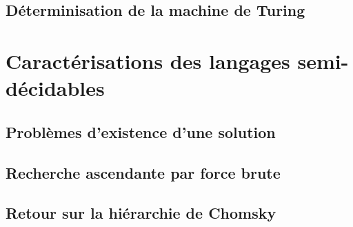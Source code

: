 \documentclass[9pt]{beamer}
\begin{document}
\subsection{Déterminisation de la machine de Turing}





 
\section{Caractérisations des langages semi-décidables}
 
\subsection{Problèmes d'existence d'une solution}







 
\subsection{Recherche ascendante par force brute}






 
\subsection{Retour sur la hiérarchie de Chomsky}




 
\end{document}
